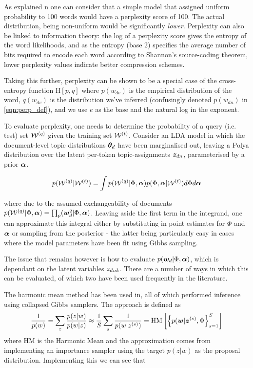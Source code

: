 As explained n \cite{Goodman2001} one can consider that a simple model that assigned uniform probability to 100 words would have a perplexity score of 100. The actual distribution, being non-uniform would be significantly \emph{lower}. Perplexity can also be linked to information theory: the log of a perplexity score gives the entropy of the word likelihoods, and as the entropy (base 2) specifies the average number of bits required to encode each word according to Shannon's source-coding theorem, lower perplexity values indicate better compression schemes.

Taking this further, perplexity can be shown to be a special case of the cross-entropy function $\text{H}[p,q]$ where $p(w_{dv})$ is the empirical distribution of the word, $q(w_{dv})$ is the distribution we've inferred (confusingly denoted $p(w_{dn})$ in \eqref{eqn:perp_def}), and we use $e$ as the base and the natural log in the exponent. 

To evaluate perplexity, one needs to determine the probability of a query (i.e. test) set $\mathcal{W}^{(q)}$ given the training set $\mathcal{W}^{(t)}$. Consider an LDA model in which the document-level topic distributions ${ \bm \theta_d }$ have been marginalised out, leaving a Polya distribution over the latent per-token topic-assignments ${ \bm z_{dn} }$, parameterised by a prior $\bm \alpha$.

\begin{align}
p(\mathcal{W}^{(q)}|\mathcal{W}^{(t)}) = \int p(\mathcal{W}^{(q)}|\Phi, \bm \alpha)p(\Phi,\bm \alpha | \mathcal{W}^{(t)}) d\Phi d\bm \alpha
\end{align}

where due to the assumed exchangeability of documents $p(\mathcal{W}^{(q)}|\Phi, \bm \alpha) = \prod_ p(\bm w_d^{q}|\Phi, \bm \alpha)$. Leaving aside the first term in the integrand, one can approximate this integral either by substituting in point estimates for $\Phi$ and $\bm \alpha$ or sampling from the posterior - the latter being particularly easy in cases where the model parameters have been fit using Gibbs sampling.

The issue that remains however is how to evaluate $p(\bm w_d|\Phi, \bm \alpha)$, which is dependant on the latent variables ${ z_{dnk} }$. There are a number of ways in which this can be evaluated, of which two have been used frequently in the literature.

The harmonic mean method has been used in\cite{Griffiths2004}\cite{Griffiths2005}\cite{Wallach2006}, all of which performed inference using collapsed Gibbs samplers. The approach is defined as
\begin{align}
\frac{1}{ {p(w)} } = \sum_z \frac{p(z|w)}{p(w|z)} \approx \frac{1}{ {S} } \sum_s \frac{1}{ {p(w|{ z }^{(s)})} }
=  \text{HM}\left[ \left\{ p(\bm w|{ \bm z }^{(s)}, \Phi \right\}_{s=1}^{S}  \right]
\end{align}
where HM is the Harmonic Mean and the approximation comes from implementing an importance sampler using the target $p(z|w)$ as the proposal distribution. Implementing this we can see that 

